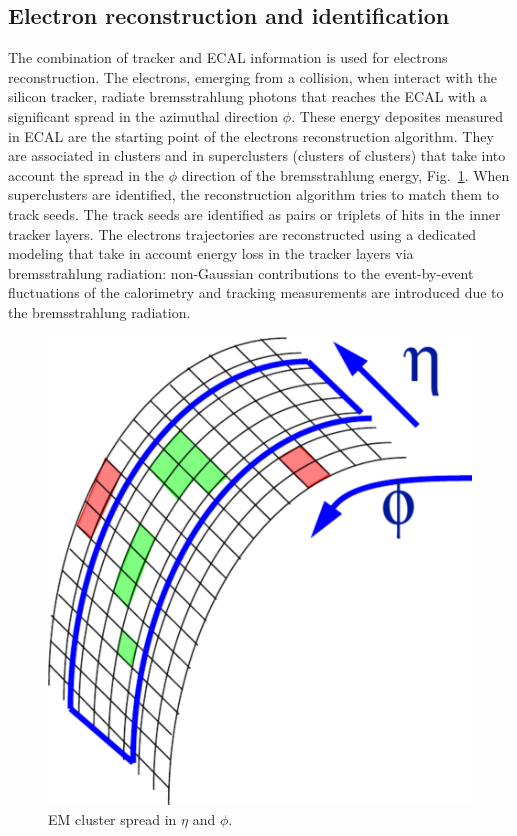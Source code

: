 \subsection*{Electron reconstruction and identification}
The combination of tracker and ECAL information is used for electrons reconstruction.
The electrons, emerging from a collision, when interact with the silicon tracker, radiate bremsstrahlung photons that reaches the ECAL with a significant spread in the azimuthal direction $\phi$. These energy deposites measured in ECAL are the starting point of the electrons reconstruction algorithm. They are associated in clusters and in superclusters (clusters of clusters) that take into account the spread in the $\phi$ direction of the bremsstrahlung energy, Fig.~\ref{clustering}.
When   superclusters are identified, the reconstruction algorithm tries to match them to track seeds. The  track seeds are identified as pairs or triplets of hits in the inner tracker layers. The electrons trajectories are reconstructed using a dedicated modeling that take in account  energy
loss in the tracker layers via  bremsstrahlung radiation: non-Gaussian contributions to the event-by-event fluctuations 
of the calorimetry and tracking measurements are introduced due to the bremsstrahlung radiation.   
\begin{figure}
\centering
\includegraphics[scale= 0.2]{../Cap4/clustering}
\caption{EM cluster spread in $\eta$ and $\phi$.}
\label{clustering}
\end{figure}
